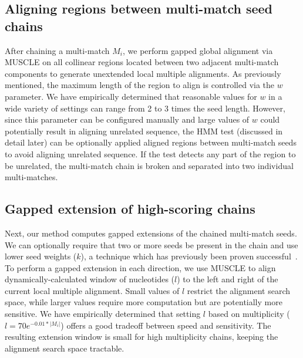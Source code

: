 \documentclass[12pt,journal,draftcls,letterpaper,onecolumn]{IEEEtran}
\begin{document}
\subsection{Aligning regions between multi-match seed chains}
After chaining a multi-match $M_i$, we perform gapped global alignment via MUSCLE on all
collinear regions located between two adjacent multi-match components to generate
unextended local multiple alignments. As previously mentioned, the maximum length of the region to align
is controlled via the $w$ parameter. We have empirically determined that reasonable values
for $w$ in a wide variety of settings can range from 2 to 3 times the seed length. However, since this
parameter can be configured manually and large values of
$w$ could potentially result in aligning unrelated sequence, the HMM test (discussed in detail later) can be optionally applied
aligned regions between multi-match seeds to avoid aligning unrelated sequence. If the test detects any part of the 
region to be unrelated, the multi-match chain is broken and separated into two individual multi-matches.

\subsection{Gapped extension of high-scoring chains}
Next, our method computes gapped extensions of the chained multi-match seeds.
We can optionally require that two or more seeds be present
in the chain and use lower seed weights ($k$), a technique which has
previously been proven
successful~\cite{ref-blastz,ref-gappedblast,ref-blat}.  To perform a
gapped extension in each direction, we use MUSCLE to align dynamically-calculated window
of nucleotides ($l$) to the left and right of the current local
multiple alignment.  Small values of $l$ restrict the alignment search
space, while larger values require more computation but are
potentially more sensitive.  We have empirically determined that
setting $l$ based on multiplicity ($l = 70e^{-0.01*|M_{i}|}$) offers a
good tradeoff between speed and sensitivity.  The resulting extension
window is small for high multiplicity chains,
keeping the alignment search space tractable.
\end{document}
